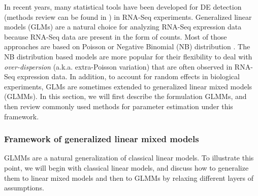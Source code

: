 In recent years, many statistical tools have  been developed for DE detection (methods review can 
be found in \cite{rapaport2013comprehensive,seyednasrollah2015comparison,soneson2013comparison}) in 
RNA-Seq experiments. Generalized linear models (GLMs) are a natural choice for analyzing RNA-Seq 
expression data because RNA-Seq data are present in the form of counts. Most of those approaches 
are based on Poisson \citep{marioni2008rna, wang2010degseq} or Negative Binomial (NB) distribution
\citep{anders2010differential,di2011nbp,oberg2012technical,robinson2007moderated, wu2013new}. %
The NB distribution based models are more popular for their flexibility to deal with 
\textit{over-dispersion} (a.k.a. extra-Poisson variation) that are often observed in RNA-Seq 
expression data. In addition, to account for random effects in biological experiments, GLMs are 
sometimes extended to generalized linear mixed models (GLMMs). In this section, we will first 
describe the formulation GLMMs, and then review commonly used methods for parameter estimation 
under this framework.

\subsubsection{Framework of generalized linear mixed models}\label{subsubsec:intro-stat-framework}
GLMMs are a natural generalization of classical linear models. To illustrate this point, we will
begin with classical linear models, and discuss how to generalize them to linear mixed models and
then to GLMMs by relaxing different layers of assumptions. 
